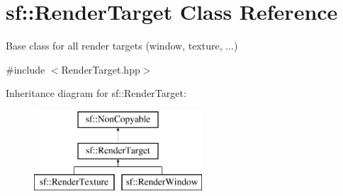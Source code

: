 \hypertarget{classsf_1_1RenderTarget}{\section{sf\-:\-:Render\-Target Class Reference}
\label{classsf_1_1RenderTarget}
}


Base class for all render targets (window, texture, ...)  




{\ttfamily \#include $<$Render\-Target.\-hpp$>$}

Inheritance diagram for sf\-:\-:Render\-Target\-:\begin{figure}[H]
\begin{center}
\leavevmode
\includegraphics[height=3.000000cm]{classsf_1_1RenderTarget}
\end{center}
\end{figure}
